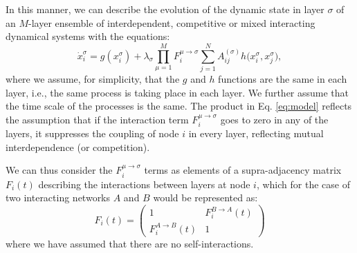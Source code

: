 \documentclass[pre,twocolumn,superscriptaddress]{revtex4}
\newcommand{\1}{\mathds{1}}
\begin{document}
{In this manner, we can describe the evolution of the dynamic state in layer $\sigma$ of an $M$-layer ensemble of interdependent, competitive or mixed interacting dynamical systems with the equations:
\begin{equation}\label{eq:model}
\dot{x}_i^\sigma = g(x_i^{\sigma})+\lambda_\sigma\prod_{\mu=1}^M F_i^{\mu\to \sigma}\sum_{j=1}^{N} A_{ij}^{(\sigma)}h\big(x_i^\sigma,x_j^\sigma \big),
\end{equation}
where we assume, for simplicity, that the $g$ and $h$ functions are the same in each layer, i.e., the same process is taking place in each layer.
We further assume that the time scale of the processes is the same.
The product in Eq. \eqref{eq:model} reflects the assumption that if the interaction term $F_i^{\mu\to \sigma}$ goes to zero in any of the layers, it suppresses the coupling of node $i$ in every layer, reflecting mutual interdependence (or competition).

We can thus consider the $F_i^{\mu\to \sigma}$ terms as elements of a supra-adjacency matrix $F_i(t)$ describing the interactions between layers at node $i$, which for the case of two interacting networks $A$ and $B$ would be represented as:
\begin{displaymath}
F_i(t)=\begin{pmatrix}
1 & F_i^{B\to A}(t)\\
F_i^{A\to B}(t) & 1
\end{pmatrix}
\end{displaymath}
where we have assumed that there are no self-interactions.

}
\end{document}
